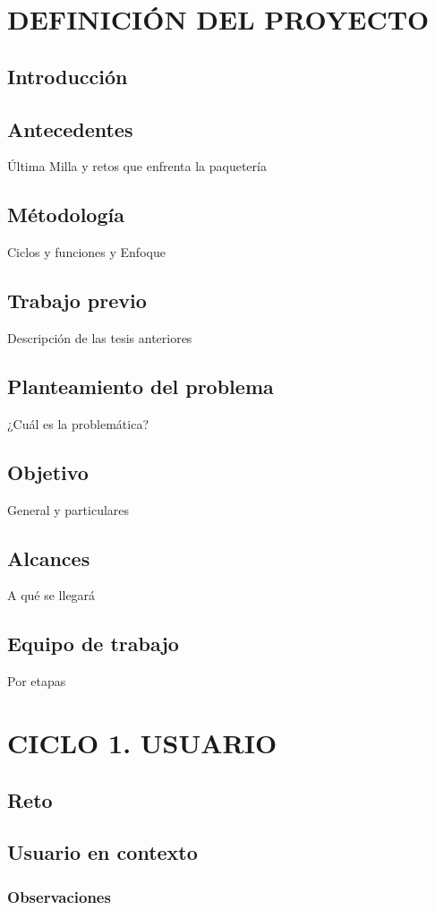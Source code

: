 \documentclass[12pt,letterpaper]{book}
\begin{document}
\setcounter{page}{1}
\chapter{DEFINICIÓN DEL PROYECTO}
\section{Introducción}
\section{Antecedentes}
Última Milla y retos que enfrenta la paquetería
\section{Métodología}
Ciclos y funciones y Enfoque
\section{Trabajo previo}
Descripción de las tesis anteriores
\section{Planteamiento del problema}
¿Cuál es la problemática?
\section{Objetivo}
General y particulares
\section{Alcances}
A qué se llegará
\section{Equipo de trabajo}
Por etapas
\newpage

\chapter{CICLO 1. USUARIO}
\section{Reto}
\section{Usuario en contexto}
\subsection{Observaciones}
\end{document}
